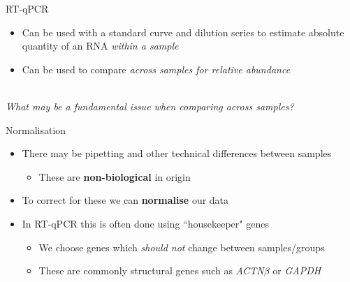 \documentclass[aspectratio=169,11pt]{beamer}
\begin{document}
\begin{frame}{RT-qPCR}

	\begin{itemize}
		\item Can be used with a standard curve and dilution series to estimate absolute quantity of an RNA \textit{within a sample}
		\item Can be used to compare \textit{across samples for relative abundance}
	\end{itemize}
	\pause
	\begin{center}
		~\\
		\textit{What may be a fundamental issue when comparing across samples?}
	\end{center}


\end{frame}

\begin{frame}{Normalisation}

	\begin{itemize}
		\item There may be pipetting and other technical differences between samples
		\begin{itemize}
			\item These are \textbf{non-biological} in origin
		\end{itemize}
		\item To correct for these we can \textbf{normalise} our data
		\item In RT-qPCR this is often done using ``housekeeper" genes
		\begin{itemize}
			\item We choose genes which \textit{should not} change between samples/groups
			\item These are commonly structural genes such as \textit{ACTN$\beta$} or \textit{GAPDH}
		\end{itemize}
	\end{itemize}

\end{frame}
\end{document}
